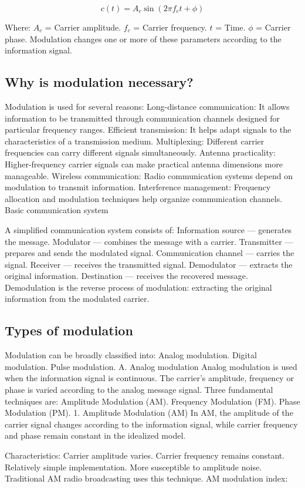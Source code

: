 \[
c(t)=A_c\sin(2\pi f_ct+\phi)
\]

Where:
$A_c$ = Carrier amplitude.
$f_c$ = Carrier frequency.
$t$ = Time.
$\phi$ = Carrier phase.
Modulation changes one or more of these parameters according to the information signal.
\subsection{Why is modulation necessary?}
Modulation is used for several reasons:
Long-distance communication: It allows information to be transmitted through communication channels designed for particular frequency ranges.
Efficient transmission: It helps adapt signals to the characteristics of a transmission medium.
Multiplexing: Different carrier frequencies can carry different signals simultaneously.
Antenna practicality: Higher-frequency carrier signals can make practical antenna dimensions more manageable.
Wireless communication: Radio communication systems depend on modulation to transmit information.
Interference management: Frequency allocation and modulation techniques help organize communication channels.
Basic communication system


A simplified communication system consists of:
Information source --- generates the message.
Modulator --- combines the message with a carrier.
Transmitter --- prepares and sends the modulated signal.
Communication channel --- carries the signal.
Receiver --- receives the transmitted signal.
Demodulator --- extracts the original information.
Destination --- receives the recovered message.
Demodulation is the reverse process of modulation: extracting the original information from the modulated carrier.
\subsection{Types of modulation}
Modulation can be broadly classified into:
Analog modulation.
Digital modulation.
Pulse modulation.
A. Analog modulation
Analog modulation is used when the information signal is continuous.
The carrier's amplitude, frequency or phase is varied according to the analog message signal.
Three fundamental techniques are:
Amplitude Modulation (AM).
Frequency Modulation (FM).
Phase Modulation (PM).
1. Amplitude Modulation (AM)
In AM, the amplitude of the carrier signal changes according to the information signal, while carrier frequency and phase remain constant in the idealized model.


Characteristics:
Carrier amplitude varies.
Carrier frequency remains constant.
Relatively simple implementation.
More susceptible to amplitude noise.
Traditional AM radio broadcasting uses this technique.
AM modulation index:

